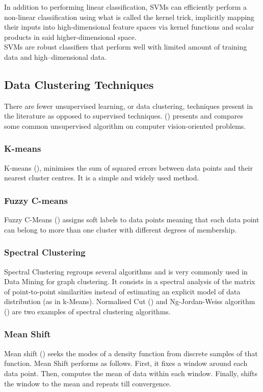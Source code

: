 \documentclass{kththesis}
\begin{document}
In addition to performing linear classification, SVMs can efficiently perform a non-linear classification using what is called the kernel trick, implicitly mapping their inputs into high-dimensional feature spaces via kernel functions and scalar products in said higher-dimensional space. \\ 
SVMs are robust classifiers that perform well with limited amount of training data and high–dimensional data.



\subsection{Data Clustering Techniques}
\label{sec:clustering_algos}
There are fewer unsupervised learning, or data clustering, techniques present in the literature as opposed to supervised techniques. 
(\textcite{ClusteringTechniques}) presents and compares some common unsupervised algorithm on computer vision-oriented problems. 
\subsubsection{K-means}
K-means (\textcite{K-means}), minimises the sum of squared errors between data points and their
nearest cluster centres. It is a simple and widely used method. 
\subsubsection{Fuzzy C-means}
Fuzzy C-Means (\textcite{Fuzzycmeans}) assigns soft labels to data points meaning that each data point
can belong to more than one cluster with different degrees of membership.
\subsubsection{Spectral Clustering}
Spectral Clustering regroups several algorithms and is very commonly used in Data Mining for graph clustering. It consists in a spectral analysis of the matrix of point-to-point similarities instead of estimating an explicit model of data distribution (as in k-Means). Normalised Cut (\textcite{SpectralShiMalik}) and  Ng-Jordan-Weiss algorithm (\textcite{SpectralNg}) are two examples of spectral clustering algorithms. 
\subsubsection{Mean Shift}
Mean shift (\textcite{meanshift}) seeks the modes of a density function from
discrete samples of that function. Mean Shift performs as follows. First, it fixes a window around
each data point. Then, computes the mean of data within each window. Finally, shifts the window
to the mean and repeats till convergence.
\end{document}

